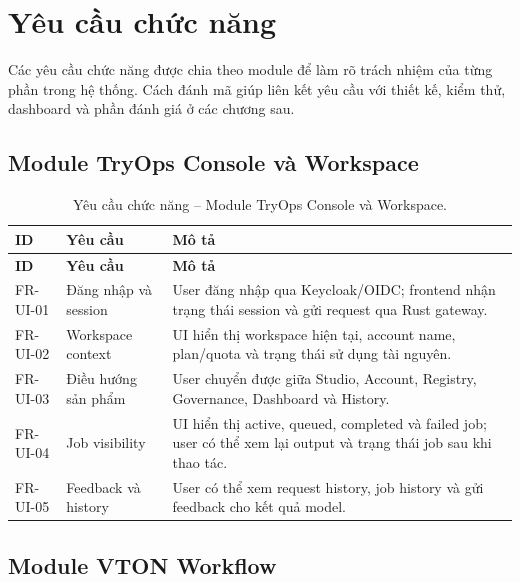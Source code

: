\documentclass[12pt,a4paper,oneside]{report}
\newcommand{\code}[1]{\texttt{\detokenize{#1}}}
\begin{document}
\section{Yêu cầu chức năng}

Các yêu cầu chức năng được chia theo module để làm rõ trách nhiệm của từng phần trong hệ thống. Cách đánh mã \code{FR-*} giúp liên kết yêu cầu với thiết kế, kiểm thử, dashboard và phần đánh giá ở các chương sau.

\subsection{Module TryOps Console và Workspace}

\begingroup
\small
\begin{longtable}{p{2.05cm}p{4.05cm}p{8.05cm}}
\caption{Yêu cầu chức năng -- Module TryOps Console và Workspace.}\\
\toprule
\textbf{ID} & \textbf{Yêu cầu} & \textbf{Mô tả} \\
\midrule
\endfirsthead
\toprule
\textbf{ID} & \textbf{Yêu cầu} & \textbf{Mô tả} \\
\midrule
\endhead
FR-UI-01 & Đăng nhập và session & User đăng nhập qua Keycloak/OIDC; frontend nhận trạng thái session và gửi request qua Rust gateway. \\
FR-UI-02 & Workspace context & UI hiển thị workspace hiện tại, account name, plan/quota và trạng thái sử dụng tài nguyên. \\
FR-UI-03 & Điều hướng sản phẩm & User chuyển được giữa Studio, Account, Registry, Governance, Dashboard và History. \\
FR-UI-04 & Job visibility & UI hiển thị active, queued, completed và failed job; user có thể xem lại output và trạng thái job sau khi thao tác. \\
FR-UI-05 & Feedback và history & User có thể xem request history, job history và gửi feedback cho kết quả model. \\
\bottomrule
\end{longtable}
\endgroup

\subsection{Module VTON Workflow}
\end{document}
